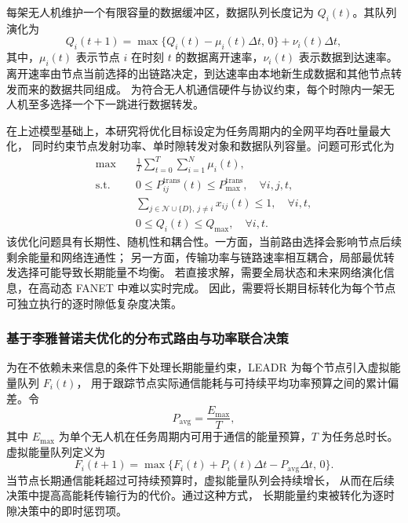 每架无人机维护一个有限容量的数据缓冲区，数据队列长度记为 $Q_i(t)$。其队列演化为
\begin{equation}
Q_i(t+1)=\max\{Q_i(t)-\mu_i(t)\Delta t,\,0\}+\nu_i(t)\Delta t,  
\end{equation}
其中，$\mu_i(t)$ 表示节点 $i$ 在时刻 $t$ 的数据离开速率，$\nu_i(t)$ 表示数据到达速率。
离开速率由节点当前选择的出链路决定，到达速率由本地新生成数据和其他节点转发而来的数据共同组成。
为符合无人机通信硬件与协议约束，每个时隙内一架无人机至多选择一个下一跳进行数据转发。

在上述模型基础上，本研究将优化目标设定为任务周期内的全网平均吞吐量最大化，
同时约束节点发射功率、单时隙转发对象和数据队列容量。问题可形式化为
\begin{align}
\max \quad & \frac{1}{T}\sum_{t=0}^{T}\sum_{i=1}^{N}\mu_i(t),\\
\text{s.t.}\quad
&0\le P_{ij}^{\mathrm{trans}}(t)\le P_{\max}^{\mathrm{trans}},
\quad \forall i,j,t,\\
&\sum_{j\in\mathcal{N}\cup\{D\},\,j\neq i}x_{ij}(t)\le 1,
\quad \forall i,t,\\
&0\le Q_i(t)\le Q_{\max},
\quad \forall i,t.
\end{align}
该优化问题具有长期性、随机性和耦合性。一方面，当前路由选择会影响节点后续剩余能量和网络连通性；
另一方面，传输功率与链路速率相互耦合，局部最优转发选择可能导致长期能量不均衡。
若直接求解，需要全局状态和未来网络演化信息，在高动态 FANET 中难以实时完成。
因此，需要将长期目标转化为每个节点可独立执行的逐时隙低复杂度决策。
\subsubsection{基于李雅普诺夫优化的分布式路由与功率联合决策}
为在不依赖未来信息的条件下处理长期能量约束，LEADR 为每个节点引入虚拟能量队列 $F_i(t)$，
用于跟踪节点实际通信能耗与可持续平均功率预算之间的累计偏差。令
\begin{equation}
P_{\mathrm{avg}}=\frac{E_{\max}}{T},  
\end{equation}
其中 $E_{\max}$ 为单个无人机在任务周期内可用于通信的能量预算，$T$ 为任务总时长。
虚拟能量队列定义为
\begin{equation}
F_i(t+1)=\max\{F_i(t)+P_i(t)\Delta t-P_{\mathrm{avg}}\Delta t,\,0\}.  
\end{equation}
当节点长期通信能耗超过可持续预算时，虚拟能量队列会持续增长，
从而在后续决策中提高高能耗传输行为的代价。通过这种方式，
长期能量约束被转化为逐时隙决策中的即时惩罚项。

